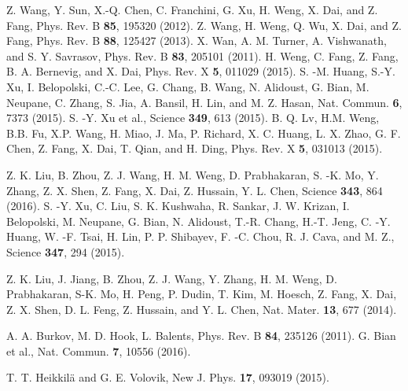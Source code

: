 \documentclass[doublecol]{epl2}
\begin{document}
\begin{thebibliography}{0}

Z. Wang, Y. Sun, X.-Q. Chen, C. Franchini, G. Xu, H. Weng, X. Dai, and Z. Fang,  Phys. Rev. B {\bf 85}, 195320 (2012).
 Z. Wang, H. Weng, Q. Wu, X. Dai, and Z. Fang,  Phys. Rev. B {\bf 88}, 125427 (2013).
 X. Wan, A. M. Turner, A. Vishwanath, and S. Y. Savrasov, Phys. Rev. B {\bf 83}, 205101 (2011).
 H. Weng, C. Fang, Z. Fang, B. A. Bernevig, and X. Dai, Phys. Rev. X {\bf 5}, 011029 (2015).
 S. -M. Huang, S.-Y. Xu, I. Belopolski, C.-C. Lee, G. Chang, B. Wang, N. Alidoust, G. Bian, M. Neupane, C. Zhang, S. Jia, A. Bansil, H. Lin, and M. Z. Hasan, Nat. Commun. {\bf 6}, 7373 (2015).
 S. -Y. Xu et al., Science {\bf 349}, 613 (2015).
 B. Q. Lv, H.M. Weng, B.B. Fu, X.P. Wang, H. Miao, J. Ma, P. Richard, X. C. Huang, L. X. Zhao, G. F. Chen, Z. Fang, X. Dai, T. Qian, and H. Ding, Phys. Rev. X {\bf 5}, 031013 (2015).
 

 
 
 Z. K. Liu, B. Zhou, Z. J. Wang, H. M. Weng, D. Prabhakaran, S. -K. Mo, Y. Zhang, Z. X. Shen, Z. Fang, X. Dai, Z. Hussain, Y. L. Chen, Science {\bf 343}, 864 (2016).
 S. -Y. Xu, C. Liu, S. K. Kushwaha, R. Sankar, J. W. Krizan, I. Belopolski, M. Neupane, G. Bian, N. Alidoust, T.-R. Chang, H.-T. Jeng, C. -Y. Huang, W. -F. Tsai, H. Lin, P. P. Shibayev, F. -C. Chou, R. J. Cava, and M. Z., Science {\bf 347}, 294 (2015).
 
 
 Z. K. Liu, J. Jiang, B. Zhou, Z. J. Wang, Y. Zhang, H. M. Weng, D. Prabhakaran, S-K. Mo, H. Peng, P. Dudin, T. Kim, M. Hoesch, Z. Fang, X. Dai, Z. X. Shen, D. L. Feng, Z. Hussain, and Y. L. Chen,  Nat. Mater. {\bf 13}, 677 (2014).
 
 A. A. Burkov, M. D. Hook, L. Balents, Phys. Rev. B {\bf 84}, 235126 (2011).
 G. Bian et al., Nat. Commun. {\bf 7}, 10556 (2016).
 
T. T. Heikkil\"{a} and G. E. Volovik,  New J. Phys. {\bf 17}, 093019 (2015).


\end{thebibliography}
\end{document}
